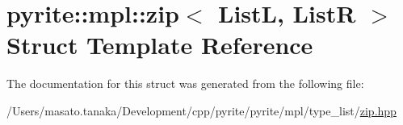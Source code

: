 \hypertarget{structpyrite_1_1mpl_1_1zip}{}\section{pyrite\+:\+:mpl\+:\+:zip$<$ ListL, ListR $>$ Struct Template Reference}
\label{structpyrite_1_1mpl_1_1zip}


The documentation for this struct was generated from the following file\+:\begin{DoxyCompactItemize}
\item 
/\+Users/masato.\+tanaka/\+Development/cpp/pyrite/pyrite/mpl/type\+\_\+list/\mbox{\hyperlink{zip_8hpp}{zip.\+hpp}}\end{DoxyCompactItemize}
